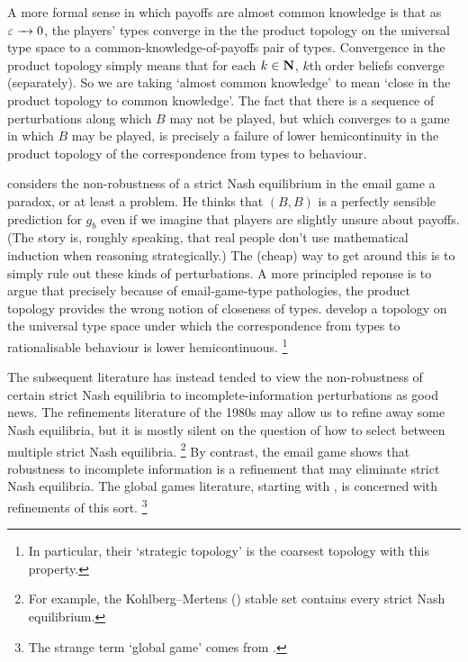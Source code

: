 \documentclass[11pt,letterpaper,reqno,oneside]{article}
\begin{document}
A more formal sense in which payoffs are almost common knowledge is that as $\varepsilon \xrightarrow{\;\;\;} 0$, the players' types converge in the the product topology on the universal type space to a common-knowledge-of-payoffs pair of types. Convergence in the product topology simply means that for each $k \in \mathbf{N}$, $k$th order beliefs converge (separately). So we are taking `almost common knowledge' to mean `close in the product topology to common knowledge'. The fact that there is a sequence of perturbations along which $B$ may not be played, but which converges to a game in which $B$ may be played, is precisely a failure of lower hemicontinuity in the product topology of the correspondence from types to behaviour.


\textcite{Rubinstein1989} considers the non-robustness of a strict Nash equilibrium in the email game a paradox, or at least a problem. He thinks that $(B,B)$ is a perfectly sensible prediction for $g_b$ even if we imagine that players are slightly unsure about payoffs. (The story is, roughly speaking, that real people don't use mathematical induction when reasoning strategically.) The (cheap) way to get around this is to simply rule out these kinds of perturbations. A more principled reponse is to argue that precisely because of email-game-type pathologies, the product topology provides the wrong notion of closeness of types. \textcite{DekelFudenbergMorris2006} develop a topology on the universal type space under which the correspondence from types to rationalisable behaviour is lower hemicontinuous.%
	\footnote{In particular, their `strategic topology' is the coarsest topology with this property.}


The subsequent literature has instead tended to view the non-robustness of certain strict Nash equilibria to incomplete-information perturbations as good news. The refinements literature of the 1980s may allow us to refine away some Nash equilibria, but it is mostly silent on the question of how to select between multiple strict Nash equilibria.%
	\footnote{For example, the Kohlberg--Mertens (\citeyear{KohlbergMertens1986}) stable set contains every strict Nash equilibrium.}
By contrast, the email game shows that robustness to incomplete information is a refinement that may eliminate strict Nash equilibria. The global games literature, starting with \textcite{CarlssonVandamme1993}, is concerned with refinements of this sort.%
	\footnote{The strange term `global game' comes from \textcite{CarlssonVandamme1993}.}


\end{document}
